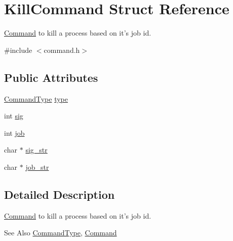 \hypertarget{structKillCommand}{\section{Kill\-Command Struct Reference}
\label{structKillCommand}
}


\hyperlink{unionCommand}{Command} to kill a process based on it's job id.  




{\ttfamily \#include $<$command.\-h$>$}

\subsection*{Public Attributes}
\begin{DoxyCompactItemize}
\item 
\hyperlink{command_8h_a21e038f5b8958e203d28bc4f18472352}{Command\-Type} \hyperlink{structKillCommand_a9cd678bc0659f74340e3fca28766bcda}{type}
\item 
int \hyperlink{structKillCommand_a20f5367bbec80a936189c57b1f9db351}{sig}
\item 
int \hyperlink{structKillCommand_abd4689c605a3dfe202a1779f0d1191ae}{job}
\item 
char $\ast$ \hyperlink{structKillCommand_a879a36b90427ec640bef5c92a6c9c24e}{sig\-\_\-str}
\item 
char $\ast$ \hyperlink{structKillCommand_a174a9714a69550b0bbf611e59bfbf332}{job\-\_\-str}
\end{DoxyCompactItemize}


\subsection{Detailed Description}
\hyperlink{unionCommand}{Command} to kill a process based on it's job id. 

\begin{DoxySeeAlso}{See Also}
\hyperlink{command_8h_aa8311e0de296df9816965be35c31d925}{Command\-Type}, \hyperlink{unionCommand}{Command} 
\end{DoxySeeAlso}


